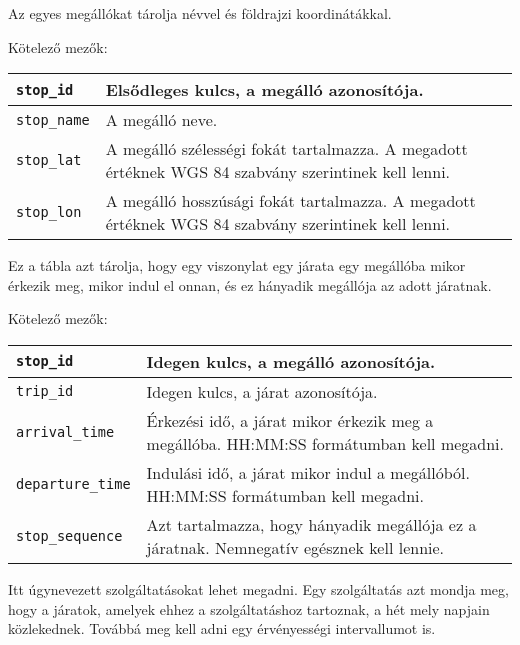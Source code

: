 
Az egyes megállókat tárolja névvel és földrajzi koordinátákkal.

\medskip

\noindent Kötelező mezők:

\bigskip

\begin{tabular}{|p{3cm}|p{10cm}|}
\hline
\texttt{stop\_id} & Elsődleges kulcs, a megálló azonosítója. \\
\hline
\texttt{stop\_name} & A megálló neve. \\
\hline
\texttt{stop\_lat} & A megálló szélességi fokát tartalmazza. A megadott értéknek WGS 84 szabvány szerintinek kell lenni. \\
\hline
\texttt{stop\_lon} & A megálló hosszúsági fokát tartalmazza. A megadott értéknek WGS 84 szabvány szerintinek kell lenni. \\
\hline
\end{tabular}


Ez a tábla azt tárolja, hogy egy viszonylat egy járata egy megállóba mikor érkezik meg, mikor indul el onnan, és ez hányadik megállója az adott járatnak.

\medskip

\noindent Kötelező mezők:

\bigskip

\begin{tabular}{|p{3cm}|p{10cm}|}
\hline
\texttt{stop\_id} & Idegen kulcs, a megálló azonosítója. \\
\hline
\texttt{trip\_id} & Idegen kulcs, a járat azonosítója. \\
\hline
\texttt{arrival\_time} & Érkezési idő, a járat mikor érkezik meg a megállóba. HH:MM:SS formátumban kell megadni. \\
\hline
\texttt{departure\_time} & Indulási idő, a járat mikor indul a megállóból. HH:MM:SS formátumban kell megadni. \\
\hline
\texttt{stop\_sequence} & Azt tartalmazza, hogy hányadik megállója ez a járatnak. Nemnegatív egésznek kell lennie. \\
\hline
\end{tabular}


Itt úgynevezett szolgáltatásokat lehet megadni. Egy szolgáltatás azt mondja meg, hogy a járatok, amelyek ehhez a szolgáltatáshoz tartoznak, a hét mely napjain közlekednek. Továbbá meg kell adni egy érvényességi intervallumot is.


